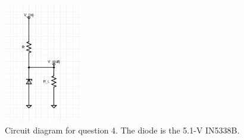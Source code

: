 \documentclass[letterpaper, reqno,11pt]{article}
\begin{document}
\begin{figure}[htpb]
    \centering
    \includegraphics[width=0.3\textwidth]{q4}
    \caption{Circuit diagram for question 4. The diode is the 5.1-V IN5338B.}
    \label{fig:q4}
\end{figure}
\end{document}
